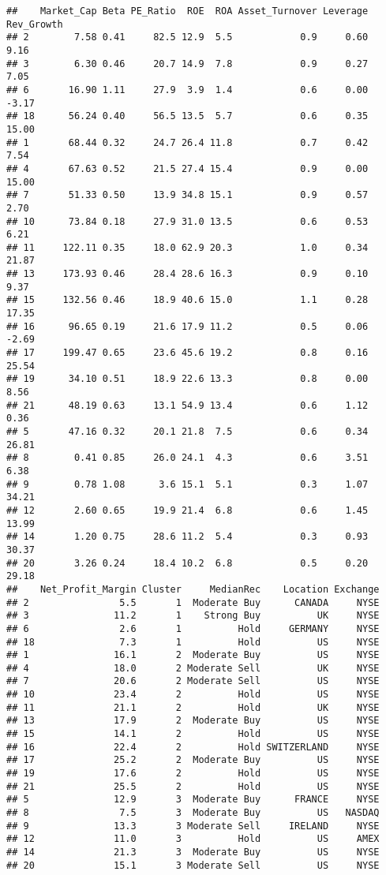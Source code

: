 \documentclass[
]{article}
\begin{document}
\begin{verbatim}
##    Market_Cap Beta PE_Ratio  ROE  ROA Asset_Turnover Leverage Rev_Growth
## 2        7.58 0.41     82.5 12.9  5.5            0.9     0.60       9.16
## 3        6.30 0.46     20.7 14.9  7.8            0.9     0.27       7.05
## 6       16.90 1.11     27.9  3.9  1.4            0.6     0.00      -3.17
## 18      56.24 0.40     56.5 13.5  5.7            0.6     0.35      15.00
## 1       68.44 0.32     24.7 26.4 11.8            0.7     0.42       7.54
## 4       67.63 0.52     21.5 27.4 15.4            0.9     0.00      15.00
## 7       51.33 0.50     13.9 34.8 15.1            0.9     0.57       2.70
## 10      73.84 0.18     27.9 31.0 13.5            0.6     0.53       6.21
## 11     122.11 0.35     18.0 62.9 20.3            1.0     0.34      21.87
## 13     173.93 0.46     28.4 28.6 16.3            0.9     0.10       9.37
## 15     132.56 0.46     18.9 40.6 15.0            1.1     0.28      17.35
## 16      96.65 0.19     21.6 17.9 11.2            0.5     0.06      -2.69
## 17     199.47 0.65     23.6 45.6 19.2            0.8     0.16      25.54
## 19      34.10 0.51     18.9 22.6 13.3            0.8     0.00       8.56
## 21      48.19 0.63     13.1 54.9 13.4            0.6     1.12       0.36
## 5       47.16 0.32     20.1 21.8  7.5            0.6     0.34      26.81
## 8        0.41 0.85     26.0 24.1  4.3            0.6     3.51       6.38
## 9        0.78 1.08      3.6 15.1  5.1            0.3     1.07      34.21
## 12       2.60 0.65     19.9 21.4  6.8            0.6     1.45      13.99
## 14       1.20 0.75     28.6 11.2  5.4            0.3     0.93      30.37
## 20       3.26 0.24     18.4 10.2  6.8            0.5     0.20      29.18
##    Net_Profit_Margin Cluster     MedianRec    Location Exchange
## 2                5.5       1  Moderate Buy      CANADA     NYSE
## 3               11.2       1    Strong Buy          UK     NYSE
## 6                2.6       1          Hold     GERMANY     NYSE
## 18               7.3       1          Hold          US     NYSE
## 1               16.1       2  Moderate Buy          US     NYSE
## 4               18.0       2 Moderate Sell          UK     NYSE
## 7               20.6       2 Moderate Sell          US     NYSE
## 10              23.4       2          Hold          US     NYSE
## 11              21.1       2          Hold          UK     NYSE
## 13              17.9       2  Moderate Buy          US     NYSE
## 15              14.1       2          Hold          US     NYSE
## 16              22.4       2          Hold SWITZERLAND     NYSE
## 17              25.2       2  Moderate Buy          US     NYSE
## 19              17.6       2          Hold          US     NYSE
## 21              25.5       2          Hold          US     NYSE
## 5               12.9       3  Moderate Buy      FRANCE     NYSE
## 8                7.5       3  Moderate Buy          US   NASDAQ
## 9               13.3       3 Moderate Sell     IRELAND     NYSE
## 12              11.0       3          Hold          US     AMEX
## 14              21.3       3  Moderate Buy          US     NYSE
## 20              15.1       3 Moderate Sell          US     NYSE
\end{verbatim}
\end{document}
